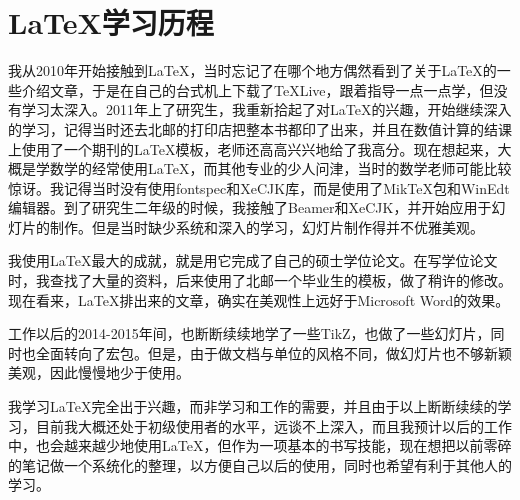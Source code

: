 \section{\LaTeX 学习历程}

我从2010年开始接触到\LaTeX ，当时忘记了在哪个地方偶然看到了关于\LaTeX 的一些介绍文章，于是在自己的台式机上下载了\TeX Live，跟着指导一点一点学，但没有学习太深入。2011年上了研究生，我重新拾起了对\LaTeX 的兴趣，开始继续深入的学习，记得当时还去北邮的打印店把整本书都印了出来，并且在数值计算的结课上使用了一个期刊的\LaTeX 模板，老师还高高兴兴地给了我高分。现在想起来，大概是学数学的经常使用\LaTeX ，而其他专业的少人问津，当时的数学老师可能比较惊讶。我记得当时没有使用fontspec和XeCJK库，而是使用了MikTeX包和WinEdt编辑器。到了研究生二年级的时候，我接触了Beamer和XeCJK，并开始应用于幻灯片的制作。但是当时缺少系统和深入的学习，幻灯片制作得并不优雅美观。

我使用\LaTeX 最大的成就，就是用它完成了自己的硕士学位论文。在写学位论文时，我查找了大量的资料，后来使用了北邮一个毕业生的模板，做了稍许的修改。现在看来，\LaTeX 排出来的文章，确实在美观性上远好于Microsoft Word的效果。

工作以后的2014-2015年间，也断断续续地学了一些TikZ，也做了一些幻灯片，同时也全面转向了\CTeX 宏包。但是，由于做文档与单位的风格不同，做幻灯片也不够新颖美观，因此慢慢地少于使用。


我学习\LaTeX 完全出于兴趣，而非学习和工作的需要，并且由于以上断断续续的学习，目前我大概还处于初级使用者的水平，远谈不上深入，而且我预计以后的工作中，也会越来越少地使用\LaTeX ，但作为一项基本的书写技能，现在想把以前零碎的笔记做一个系统化的整理，以方便自己以后的使用，同时也希望有利于其他人的学习。